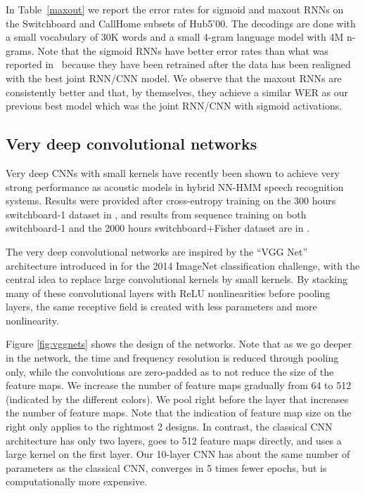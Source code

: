 \documentclass[a4paper]{article}
\begin{document}
In Table~\ref{maxout} we report the error rates for sigmoid and maxout
RNNs on the Switchboard and CallHome subsets of Hub5'00. The decodings
are done with a small vocabulary of 30K words and a small 4-gram
language model with 4M n-grams.  Note that the sigmoid RNNs have
better error rates than what was reported in~\cite{saon15} because
they have been retrained after the data has been realigned with the
best joint RNN/CNN model. We observe that the maxout RNNs are
consistently better and that, by themselves, they achieve a similar
WER as our previous best model which was the joint RNN/CNN with
sigmoid activations.

\subsection{Very deep convolutional networks}
Very deep CNNs with small  kernels have recently been shown to achieve
very strong performance as acoustic models in hybrid NN-HMM speech recognition systems.
Results were provided after cross-entropy training on the 300 hours switchboard-1 dataset in \cite{sercu2015very},
and results from sequence training on both switchboard-1 and the 2000 hours switchboard+Fisher dataset are in \cite{sercu2016advances}.

The very deep convolutional networks are inspired by the ``VGG Net'' architecture 
introduced in \cite{simonyan2014very} for the 2014 ImageNet classification challenge,
with the central idea to replace large convolutional kernels by small  kernels.
By stacking many of these convolutional layers with ReLU nonlinearities before pooling layers,
the same receptive field is created with less parameters and more nonlinearity.

Figure \ref{fig:vggnets} shows the design of the networks.
Note that as we go deeper in the network, the time and frequency resolution is reduced
through pooling only, while the convolutions are zero-padded as to not reduce the size of the feature maps.
We increase the number of feature maps gradually from 64 to 512 (indicated by the different colors).
We pool right before the layer that increases the number of feature maps.
Note that the indication of feature map size on the right only applies to the rightmost 2 designs.
In contrast, the classical CNN architecture has only two layers, goes to 512 feature maps directly,
and uses a large  kernel on the first layer.
Our 10-layer CNN has about the same number of parameters as the classical CNN,
converges in 5 times fewer epochs, but is computationally more expensive.
\end{document}

